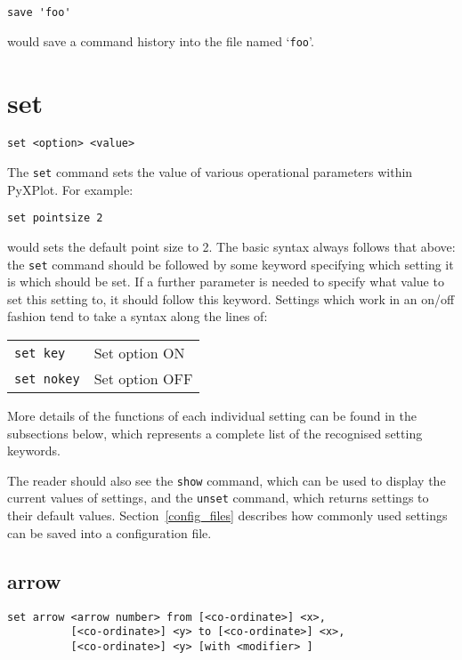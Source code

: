 \documentclass[a4paper,onecolumn,11pt]{book}
\begin{document}
\begin{verbatim}
save 'foo'
\end{verbatim}

\noindent would save a command history into the file named `{\tt foo}'.


\section{set}

\begin{verbatim}
set <option> <value>
\end{verbatim}

The {\tt set} command sets the value of various operational parameters within
PyXPlot.  For example:

\begin{verbatim}
set pointsize 2
\end{verbatim}

\noindent would sets the default point size to 2. The basic syntax always
follows that above: the {\tt set} command should be followed by some keyword
specifying which setting it is which should be set. If a further parameter is
needed to specify what value to set this setting to, it should follow this
keyword. Settings which work in an on/off fashion tend to take a syntax along
the lines of:

\begin{tabular}{ll}
{\tt set key} & Set option ON \\
{\tt set nokey} & Set option OFF
\end{tabular}

More details of the functions of each individual setting can be found in the
subsections below, which represents a complete list of the recognised setting
keywords.

The reader should also see the {\tt show} command, which can be used to display
the current values of settings, and the {\tt unset} command, which returns
settings to their default values. Section~\ref{config_files} describes how
commonly used settings can be saved into a configuration file.

\subsection{arrow}

\begin{verbatim}
set arrow <arrow number> from [<co-ordinate>] <x>,
          [<co-ordinate>] <y> to [<co-ordinate>] <x>,
          [<co-ordinate>] <y> [with <modifier> ]
\end{verbatim}
\end{document}
